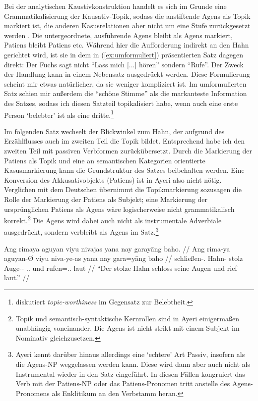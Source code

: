\documentclass[12pt,paper=a4]{scrartcl}
\newcommand{\TsgM}{{\Tsg}.{\M}}
\newcommand{\fw}[1]{\textit{#1}} %
\begin{document}
Bei der analytischen Kaustivkonstruktion handelt es sich im Grunde eine Grammatikalisierung der Kausativ-Topik, sodass die anstiftende Agens als Topik markiert ist, die anderen Kasusrelationen aber nicht um eine Stufe zurückgesetzt werden \autocite[vgl.][Kap. 8.2]{comrie1989}. Die untergeordnete, ausführende Agens bleibt als Agens markiert, Patiens bleibt Patiens etc. Während hier die Aufforderung indirekt an den Hahn gerichtet wird, ist sie in dem in (\ref{ex:umformuliert}) präsentierten Satz dagegen direkt: Der Fuchs sagt nicht \enquote{Lass mich [...] hören} sondern \enquote{Rufe}. Der Zweck der Handlung kann in einem Nebensatz ausgedrückt werden. Diese Formulierung scheint mir etwas natürlicher, da sie weniger kompliziert ist. Im umformulierten Satz schien mir außerdem die \enquote{schöne Stimme} als die markanteste Information des Satzes, sodass ich diesen Satzteil topikalisiert habe, wenn auch eine erste Person \enquote*{belebter} ist als eine dritte.\footnote{\textcite[197--199]{comrie1989} diskutiert \fw{topic-worthiness} im Gegensatz zur Belebtheit.}

Im folgenden Satz wechselt der Blickwinkel zum Hahn, der aufgrund des Erzählflusses auch im zweiten Teil die Topik bildet. Entsprechend habe ich den zweiten Teil mit passiven Verbformen zurückübersetzt. Durch die Markierung der Patiens als Topik und eine an semantischen Kategorien orientierte Kasusmarkierung kann die Grundstruktur des Satzes beibehalten werden. Eine Konversion des Akkusativobjekts (Patiens) ist in Ayeri also nicht nötig. Verglichen mit dem Deutschen übernimmt die Topikmarkierung sozusagen die Rolle der Markierung der Patiens als Subjekt; eine Markierung der ursprünglichen Patiens als Agens wäre logischerweise nicht grammatikalisch korrekt.\footnote{Topik und semantisch-syntaktische Kernrollen sind in Ayeri einigermaßen unabhängig voneinander. Die Agens ist nicht strikt mit einem Subjekt im Nominativ gleichzusetzen.} Die Agens wird dabei auch nicht als instrumentale Adverbiale ausgedrückt, sondern verbleibt als Agens im Satz.\footnote{Ayeri kennt darüber hinaus allerdings eine \enquote*{echtere} Art Passiv, insofern als die Agens-NP weggelassen werden kann. Diese wird dann aber auch nicht als Instrumental wieder in den Satz eingeführt. In diesen Fällen kongruiert das Verb mit der Patiens-NP oder das Patiens-Pronomen tritt anstelle des Agens-Pronomens als Enklitikum an den Verbstamm heran.}

\pex %
\a\label{ex:itrvb}\begingl
	\gla Ang rimaya aguyan viyu nivajas yana nay garayāng baho. //
	\glb Ang rima-ya aguyan-Ø viyu niva-ye-as yana nay gara=yāng baho //
	\glc \AgtT{} schließen-\TsgM{} Hahn-\Top{} stolz Auge-\Pl{}-\Parg{} \TsgM{}.\Gen{} und rufen=\TsgM{}.\Aarg{} laut //
	\glft \enquote{Der stolze Hahn schloss seine Augen und rief laut.} //
\endgl
\end{document}
